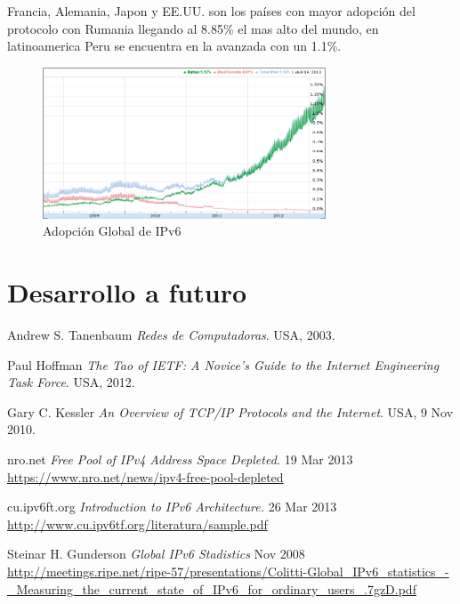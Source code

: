 \documentclass[11pt,a4paper]{article}
\begin{document}
Francia, Alemania, Japon y EE.UU. son los países con mayor adopción del protocolo con Rumania 
llegando al 8.85\% el mas alto del mundo, en latinoamerica Peru se encuentra en la avanzada con un 
1.1\%.
\begin{figure}[h!]
 \centering
 \includegraphics[width=0.75\textwidth]{adopcionIPv6.png}
 \caption[Adopción Global de IPv6]{Adopción Global de IPv6}
\end{figure}



\section{Desarrollo a futuro}

\newpage
\begin{thebibliography}{9}

  Andrew S. Tanenbaum
  \emph{Redes de Computadoras}.
  USA,
  2003.

  Paul Hoffman
  \emph{The Tao of IETF: A Novice's Guide to the Internet Engineering Task Force}.
  USA,
  2012.
		
  Gary C. Kessler
  \emph{An Overview of TCP/IP Protocols and the Internet}.
  USA,
  9 Nov 2010.
		
 nro.net
 \emph{Free Pool of IPv4 Address Space Depleted.} 
 19 Mar 2013\\
	\url{https://www.nro.net/news/ipv4-free-pool-depleted}	

 cu.ipv6ft.org 
 \emph{Introduction to IPv6 Architecture.} 
 26 Mar 2013\\
	\url{http://www.cu.ipv6tf.org/literatura/sample.pdf}

 Steinar H. Gunderson
 \emph{Global IPv6 Stadistics}
 Nov 2008\\
 \url{http://meetings.ripe.net/ripe-57/presentations/Colitti-Global_IPv6_statistics_-_Measuring_the_current_state_of_IPv6_for_ordinary_users_.7gzD.pdf}
					
\end{thebibliography}
\end{document}

